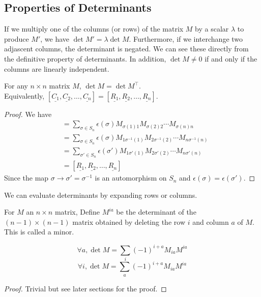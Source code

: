 \subsection{Properties of Determinants}
If we multiply one of the columns (or rows) of the matrix $M$ by a scalar $\lambda$ to produce $M'$, we have $\det M'=\lambda\det M$.
Furthermore, if we interchange two adjascent columns, the determinant is negated.
We can see these directly from the definitive property of determinants.
In addition, $\det M\neq 0$ if and only if the columns are linearly independent.
\begin{proposition}
    For any $n\times n$ matrix $M$, $\det M=\det M^\top$.\\
    Equivalently, $[\underline{C_1},\underline{C_2},\ldots,\underline{C_n}]=[\underline{R_1},\underline{R_2},\ldots,\underline{R_n}]$.
\end{proposition}
\begin{proof}
    We have
    \begin{align*}
        [\underline{C_1},\underline{C_2},\ldots,\underline{C_n}]&=\sum_{\sigma\in S_n}\epsilon(\sigma)M_{\sigma(1)1}M_{\sigma(2)2}\cdots M_{\sigma(n)n}\\
        &=\sum_{\sigma\in S_n}\epsilon(\sigma)M_{1\sigma^{-1}(1)}M_{2\sigma^{-1}(2)}\cdots M_{n\sigma^{-1}(n)}\\
        &=\sum_{\sigma'\in S_n}\epsilon(\sigma')M_{1\sigma'(1)}M_{2\sigma'(2)}\cdots M_{n\sigma'(n)}\\
        &=[\underline{R_1},\underline{R_2},\ldots,\underline{R_n}]
    \end{align*}
    Since the map $\sigma\to\sigma'=\sigma^{-1}$ is an automorphism on $S_n$ and $\epsilon(\sigma)=\epsilon(\sigma')$.
\end{proof}
We can evaluate determinants by expanding rows or columns.
\begin{definition}
    For $M$ an $n\times n$ matrix,
    Define $M^{ia}$ be the determinant of the $(n-1)\times (n-1)$ matrix obtained by deleting the row $i$ and column $a$ of $M$.
    This is called a minor.
\end{definition}
\begin{proposition}\label{det_formula}
    $$\forall a,\det{M}=\sum_i(-1)^{i+a}M_{ia}M^{ia}$$
    $$\forall i,\det{M}=\sum_a(-1)^{i+a}M_{ia}M^{ia}$$
\end{proposition}
\begin{proof}
    Trivial but see later sections for the proof.
\end{proof}
